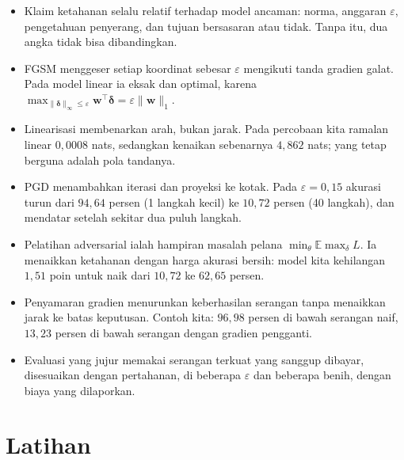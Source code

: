 \begin{ringkasan}
\begin{itemize}
  \item Klaim ketahanan selalu relatif terhadap model ancaman: norma, anggaran
        $\varepsilon$, pengetahuan penyerang, dan tujuan bersasaran atau tidak.
        Tanpa itu, dua angka tidak bisa dibandingkan.
  \item FGSM menggeser setiap koordinat sebesar $\varepsilon$ mengikuti tanda gradien
        galat. Pada model linear ia eksak dan optimal, karena
        $\max_{\lVert\boldsymbol{\delta}\rVert_\infty\le\varepsilon}
        \mathbf{w}^{\top}\boldsymbol{\delta}=\varepsilon\lVert\mathbf{w}\rVert_1$.
  \item Linearisasi membenarkan arah, bukan jarak. Pada percobaan kita ramalan linear
        $0{,}0008$ nats, sedangkan kenaikan sebenarnya $4{,}862$ nats; yang tetap
        berguna adalah pola tandanya.
  \item PGD menambahkan iterasi dan proyeksi ke kotak. Pada $\varepsilon=0{,}15$
        akurasi turun dari $94{,}64$ persen (1 langkah kecil) ke $10{,}72$ persen
        (40 langkah), dan mendatar setelah sekitar dua puluh langkah.
  \item Pelatihan adversarial ialah hampiran masalah pelana
        $\min_\theta\mathbb{E}\max_\delta L$. Ia menaikkan ketahanan dengan harga
        akurasi bersih: model kita kehilangan $1{,}51$ poin untuk naik dari $10{,}72$
        ke $62{,}65$ persen.
  \item Penyamaran gradien menurunkan keberhasilan serangan tanpa menaikkan jarak ke
        batas keputusan. Contoh kita: $96{,}98$ persen di bawah serangan naif,
        $13{,}23$ persen di bawah serangan dengan gradien pengganti.
  \item Evaluasi yang jujur memakai serangan terkuat yang sanggup dibayar, disesuaikan
        dengan pertahanan, di beberapa $\varepsilon$ dan beberapa benih, dengan biaya
        yang dilaporkan.
\end{itemize}
\end{ringkasan}

\section{Latihan}

